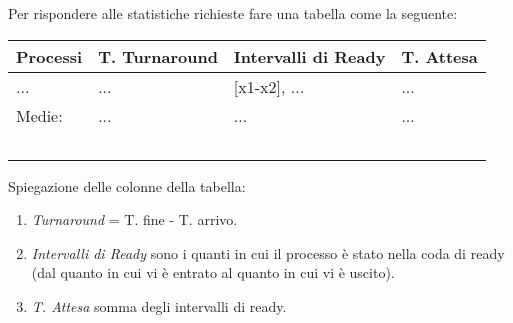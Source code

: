 Per rispondere alle statistiche richieste fare una tabella come la seguente:

\begin{center}
	\begin{tabular}{llll}
	Processi & T. Turnaround & Intervalli di Ready & T. Attesa \\
	\hline
	...	& ... & [x1-x2], ... & ... \\
	\hline
	Medie: & ... & ... & ... \\\
	\end{tabular}
\end{center}

Spiegazione delle colonne della tabella:
\begin{enumerate}
	\item \textit{Turnaround} = T. fine - T. arrivo.
	\item \textit{Intervalli di Ready} sono i quanti in cui il processo è stato nella coda di ready (dal quanto in cui vi è entrato al quanto in cui vi è uscito).
	\item \textit{T. Attesa} somma degli intervalli di ready.
\end{enumerate}